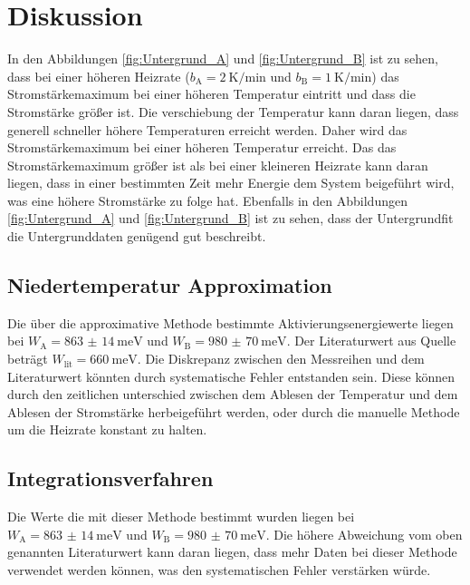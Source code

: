 \section{Diskussion}
\label{sec:Diskussion}
In den Abbildungen \ref{fig:Untergrund_A} und \ref{fig:Untergrund_B} ist zu sehen, dass bei einer höheren Heizrate ($b_{\text{A}}=
\SI{2}{\kelvin\per\minute}$ und $b_{\text{B}}=\SI{1}{\kelvin\per\minute}$) das Stromstärkemaximum bei einer höheren Temperatur 
eintritt und dass die Stromstärke größer ist. Die verschiebung der Temperatur kann daran liegen, dass generell schneller höhere
Temperaturen erreicht werden. Daher wird das Stromstärkemaximum bei einer höheren Temperatur erreicht. Das das Stromstärkemaximum
größer ist als bei einer kleineren Heizrate kann daran liegen, dass in einer bestimmten Zeit mehr Energie dem System beigeführt wird,
was eine höhere Stromstärke zu folge hat. Ebenfalls in den Abbildungen \ref{fig:Untergrund_A} und \ref{fig:Untergrund_B} ist zu sehen,
dass der Untergrundfit die Untergrunddaten genügend gut beschreibt.
\subsection{Niedertemperatur Approximation}
Die über die approximative Methode bestimmte Aktivierungsenergiewerte liegen bei $W_{\text{A}}=\SI{863(14)}{\milli\eV}$ und
$W_{\text{B}}=\SI{980(70)}{\milli\eV}$. Der Literaturwert aus Quelle \cite{Muccillo} beträgt $W_{\text{lit}}=\SI{660}{\milli\eV}$.
Die Diskrepanz zwischen den Messreihen und dem Literaturwert könnten durch systematische Fehler entstanden sein. Diese können 
durch den zeitlichen unterschied zwischen dem Ablesen der Temperatur und dem Ablesen der Stromstärke herbeigeführt werden, oder 
durch die manuelle Methode um die Heizrate konstant zu halten. 
\subsection{Integrationsverfahren}
Die Werte die mit dieser Methode bestimmt wurden liegen bei $W_{\text{A}}=\SI{863(14)}{\milli\eV}$ und $W_{\text{B}}=\SI{980(70)}{\milli\eV}$.
Die höhere Abweichung vom oben genannten Literaturwert kann daran liegen, dass mehr Daten bei dieser Methode verwendet werden können, was den systematischen 
Fehler verstärken würde. 
